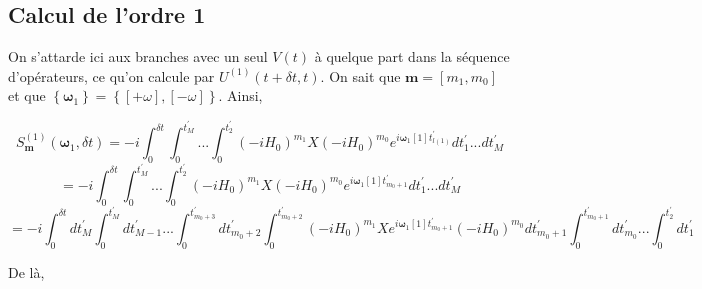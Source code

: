 \subsection{Calcul de l'ordre 1}
On s'attarde ici aux branches avec un seul $V(t)$ à quelque part dans la séquence d'opérateurs, ce qu'on calcule par $ U^{(1)}(t+\delta t, t)$. On sait que $\boldsymbol{m} = [m_1, m_0]$ et que $\left\{\boldsymbol{\omega}_1\right\} = \left\{[+\omega], [-\omega]\right\}$. Ainsi, 

\begin{equation*}
    S^{(1)}_{\boldsymbol{m}}(\boldsymbol{\omega}_1, \delta t) = -i\int_{0}^{\delta t}\int_{0}^{t_M^{'}}... \int_{0}^{t_2^{'}}(-iH_0)^{m_1}X(-iH_0)^{m_0} e^{i\boldsymbol{\omega}_1[1]t^{'}_{l(1)}}dt_1^{'} ... dt_M^{'}
\end{equation*}
\begin{equation*}
    = -i\int_{0}^{\delta t}\int_{0}^{t_M^{'}}... \int_{0}^{t_2^{'}}(-iH_0)^{m_1}X(-iH_0)^{m_0} e^{i\boldsymbol{\omega}_1[1]t^{'}_{m_0+1}}dt_1^{'} ... dt_M^{'}
\end{equation*}
\begin{equation*}
    = -i\int_{0}^{\delta t}dt^{'}_M\int_{0}^{t_M^{'}}dt^{'}_{M-1}...\int_{0}^{t^{'}_{m_0 + 3}}dt^{'}_{m_0 + 2}\int_{0}^{t^{'}_{m_0 + 2}}(-iH_0)^{m_1}Xe^{i\boldsymbol{\omega}_1[1]t^{'}_{m_0+1}}(-iH_0)^{m_0}  dt^{'}_{m_0 + 1} \int_{0}^{t^{'}_{m_0 + 1}}dt^{'}_{m_0}... \int_{0}^{t_2^{'}}dt_1^{'}
\end{equation*}









De là,

